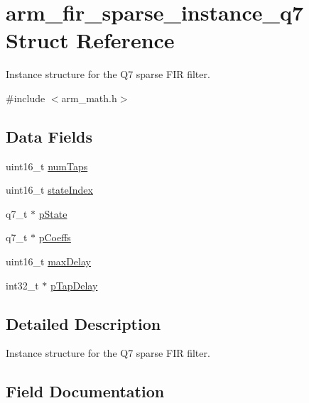 \hypertarget{structarm__fir__sparse__instance__q7}{}\section{arm\+\_\+fir\+\_\+sparse\+\_\+instance\+\_\+q7 Struct Reference}
\label{structarm__fir__sparse__instance__q7}


Instance structure for the Q7 sparse F\+IR filter.  




{\ttfamily \#include $<$arm\+\_\+math.\+h$>$}

\subsection*{Data Fields}
\begin{DoxyCompactItemize}
\item 
uint16\+\_\+t \mbox{\hyperlink{structarm__fir__sparse__instance__q7_a751941891e47f522a7f5375fe8990aac}{num\+Taps}}
\item 
uint16\+\_\+t \mbox{\hyperlink{structarm__fir__sparse__instance__q7_a566a0cb53437e48b9a3bf18e5b03d8aa}{state\+Index}}
\item 
q7\+\_\+t $\ast$ \mbox{\hyperlink{structarm__fir__sparse__instance__q7_aa8f67102521b620af6f259afdcf29785}{p\+State}}
\item 
q7\+\_\+t $\ast$ \mbox{\hyperlink{structarm__fir__sparse__instance__q7_a54407554b4fe7bbbb43924e4eea45e7f}{p\+Coeffs}}
\item 
uint16\+\_\+t \mbox{\hyperlink{structarm__fir__sparse__instance__q7_ab25f4ee7550e6d92acff77ada283733f}{max\+Delay}}
\item 
int32\+\_\+t $\ast$ \mbox{\hyperlink{structarm__fir__sparse__instance__q7_adec00b3793ab4f08edfeb4ea6a9eb6e6}{p\+Tap\+Delay}}
\end{DoxyCompactItemize}


\subsection{Detailed Description}
Instance structure for the Q7 sparse F\+IR filter. 

\subsection{Field Documentation}
\mbox{\label{structarm__fir__sparse__instance__q7_ab25f4ee7550e6d92acff77ada283733f}} 

